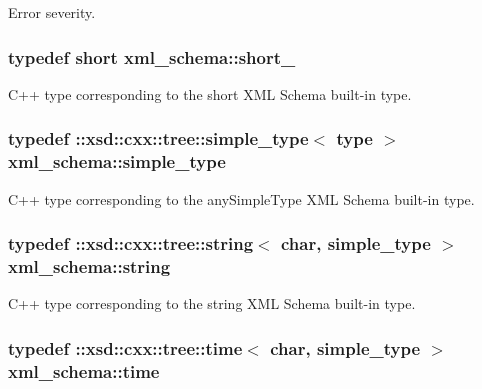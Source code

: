Error severity. 

\hypertarget{namespacexml__schema_a705720c1fed1575ccdcfd21cb7ab39ab}{
\subsubsection[{short\+\_\+}]{\setlength{\rightskip}{0pt plus 5cm}typedef short {\bf xml\+\_\+schema\+::short\+\_\+}}}\label{namespacexml__schema_a705720c1fed1575ccdcfd21cb7ab39ab}


C++ type corresponding to the short X\+M\+L Schema built-\/in type. 

\hypertarget{namespacexml__schema_a44789bb4367951bcf8ae867cb983324d}{
\subsubsection[{simple\+\_\+type}]{\setlength{\rightskip}{0pt plus 5cm}typedef \+::xsd\+::cxx\+::tree\+::simple\+\_\+type$<$ {\bf type} $>$ {\bf xml\+\_\+schema\+::simple\+\_\+type}}}\label{namespacexml__schema_a44789bb4367951bcf8ae867cb983324d}


C++ type corresponding to the any\+Simple\+Type X\+M\+L Schema built-\/in type. 

\hypertarget{namespacexml__schema_aefbaf353f9a0043af46d23d9040ef268}{
\subsubsection[{string}]{\setlength{\rightskip}{0pt plus 5cm}typedef \+::xsd\+::cxx\+::tree\+::string$<$ char, {\bf simple\+\_\+type} $>$ {\bf xml\+\_\+schema\+::string}}}\label{namespacexml__schema_aefbaf353f9a0043af46d23d9040ef268}


C++ type corresponding to the string X\+M\+L Schema built-\/in type. 

\hypertarget{namespacexml__schema_a75a88454d26d1fbbe712e22e9e994cee}{
\subsubsection[{time}]{\setlength{\rightskip}{0pt plus 5cm}typedef \+::xsd\+::cxx\+::tree\+::time$<$ char, {\bf simple\+\_\+type} $>$ {\bf xml\+\_\+schema\+::time}}}\label{namespacexml__schema_a75a88454d26d1fbbe712e22e9e994cee}


